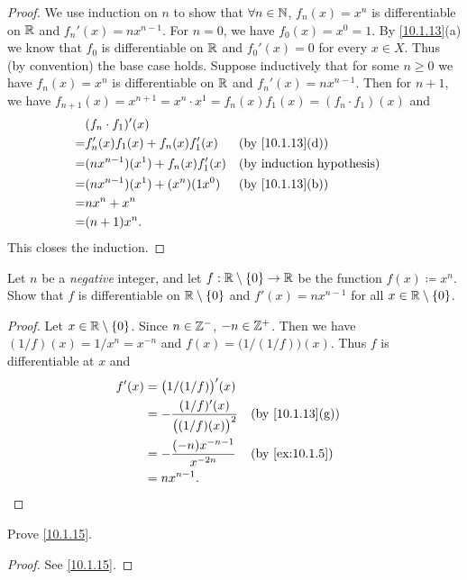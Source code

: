 \begin{proof}
  We use induction on \(n\) to show that \(\forall n \in \mathbb{N}\), \(f_n(x) = x^n\) is differentiable on \(\mathbb{R}\) and \(f_n'(x) = n x^{n - 1}\).
  For \(n = 0\), we have \(f_0(x) = x^0 = 1\).
  By \cref{10.1.13}(a) we know that \(f_0\) is differentiable on \(\mathbb{R}\) and \(f_0'(x) = 0\) for every \(x \in X\).
  Thus (by convention) the base case holds.
  Suppose inductively that for some \(n \geq 0\) we have \(f_n(x) = x^n\) is differentiable on \(\mathbb{R}\) and \(f_n'(x) = n x^{n - 1}\).
  Then for \(n + 1\), we have \(f_{n + 1}(x) = x^{n + 1} = x^n \cdot x^1 = f_n(x) f_1(x) = (f_n \cdot f_1)(x)\) and
  \begin{align*}
      & (f_n \cdot f_1)'(x)                                                    \\
    = & f_n'(x) f_1(x) + f_n(x) f_1'(x)     &  & \text{(by \cref{10.1.13}(d))} \\
    = & (n x^{n - 1})(x^1) + f_n(x) f_1'(x) &  & \byIH                         \\
    = & (n x^{n - 1})(x^1) + (x^n)(1 x^0)   &  & \text{(by \cref{10.1.13}(b))} \\
    = & n x^n + x^n                                                            \\
    = & (n + 1) x^n.
  \end{align*}
  This closes the induction.
\end{proof}

\begin{ex}\label{ex:10.1.6}
  Let \(n\) be a \emph{negative} integer, and let \(f : \mathbb{R} \setminus \{0\} \to \mathbb{R}\) be the function \(f(x) \coloneqq x^n\).
  Show that \(f\) is differentiable on \(\mathbb{R} \setminus \{0\}\) and \(f'(x) = n x^{n - 1}\) for all \(x \in \mathbb{R} \setminus \{0\}\).
\end{ex}

\begin{proof}
  Let \(x \in \mathbb{R} \setminus \{0\}\).
  Since \(n \in \mathbb{Z}^-\), \(-n \in \mathbb{Z}^+\).
  Then we have \((1 / f)(x) = 1 / x^n = x^{-n}\) and \(f(x) = \big(1 / (1 / f)\big)(x)\).
  Thus \(f\) is differentiable at \(x\) and
  \begin{align*}
    f'(x) & = \big(1 / (1 / f)\big)'(x)                                                       \\
          & = -\dfrac{(1 / f)'(x)}{\big((1 / f)(x)\big)^2} &  & \text{(by \cref{10.1.13}(g))} \\
          & = -\dfrac{(-n) x^{-n - 1}}{x^{-2n}}            &  & \by{ex:10.1.5}                \\
          & = n x^{n - 1}.
  \end{align*}
\end{proof}

\begin{ex}\label{ex:10.1.7}
  Prove \cref{10.1.15}.
\end{ex}

\begin{proof}
  See \cref{10.1.15}.
\end{proof}